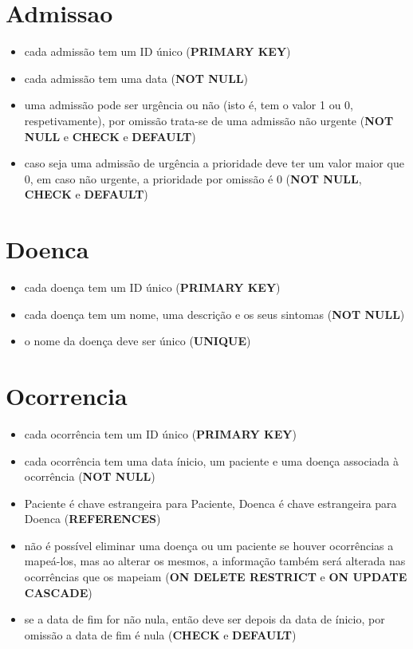 \documentclass[article, a4paper, 12pt, oneside]{memoir}
\begin{document}
\section*{Admissao}
\begin{itemize}
	\item cada admissão tem um ID único (\textbf{PRIMARY KEY})
	\item cada admissão tem uma data (\textbf{NOT NULL})
	\item uma admissão pode ser urgência ou não (isto é, tem o valor 1 ou 0, respetivamente), por omissão trata-se de uma admissão não urgente (\textbf{NOT NULL} e \textbf{CHECK} e \textbf{DEFAULT})
	\item caso seja uma admissão de urgência a prioridade deve ter um valor maior que 0, em caso não urgente, a prioridade por omissão é 0 (\textbf{NOT NULL}, \textbf{CHECK} e \textbf{DEFAULT})
\end{itemize}

\section*{Doenca}
\begin{itemize}
	\item cada doença tem um ID único (\textbf{PRIMARY KEY})
	\item cada doença tem um nome, uma descrição e os seus sintomas (\textbf{NOT NULL})
	\item o nome da doença deve ser único (\textbf{UNIQUE})
\end{itemize}

\section*{Ocorrencia}
\begin{itemize}
	\item cada ocorrência tem um ID único (\textbf{PRIMARY KEY})
	\item cada ocorrência tem uma data ínicio, um paciente e uma doença associada à ocorrência (\textbf{NOT NULL})
	\item Paciente é chave estrangeira para Paciente, Doenca é chave estrangeira para Doenca (\textbf{REFERENCES})
	\item não é possível eliminar uma doença ou um paciente se houver ocorrências a mapeá-los, mas ao alterar os mesmos, a informação também será alterada nas ocorrências que os mapeiam (\textbf{ON DELETE RESTRICT} e \textbf{ON UPDATE CASCADE})
	\item se a data de fim for não nula, então deve ser depois da data de ínicio, por omissão a data de fim é nula (\textbf{CHECK} e \textbf{DEFAULT})
\end{itemize}
\end{document}
